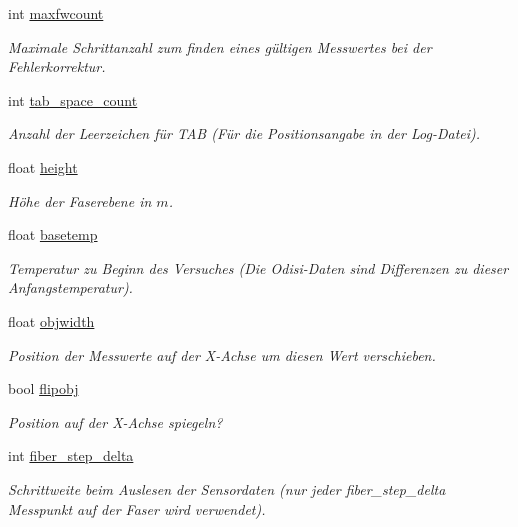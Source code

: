 \begin{DoxyCompactItemize}
int \hyperlink{structODiSIToSD_1_1Options_a03f0d8cd1ad0cbcaf9f3cee8ca6d536f}{maxfwcount}
\begin{DoxyCompactList}\small\item\em Maximale Schrittanzahl zum finden eines gültigen Messwertes bei der Fehlerkorrektur. \end{DoxyCompactList}\item 
int \hyperlink{structODiSIToSD_1_1Options_a6c1e796c1c96e350f7f01982ccc2b32f}{tab\-\_\-space\-\_\-count}
\begin{DoxyCompactList}\small\item\em Anzahl der Leerzeichen für T\-A\-B (Für die Positionsangabe in der Log-\/\-Datei). \end{DoxyCompactList}\item 
float \hyperlink{structODiSIToSD_1_1Options_af91210949f20d204dfea863766b53f9f}{height}
\begin{DoxyCompactList}\small\item\em Höhe der Faserebene in $m$. \end{DoxyCompactList}\item 
float \hyperlink{structODiSIToSD_1_1Options_a6fd0fff59f304ba9e8aee6a7c44a148a}{basetemp}
\begin{DoxyCompactList}\small\item\em Temperatur zu Beginn des Versuches (Die Odisi-\/\-Daten sind Differenzen zu dieser Anfangstemperatur). \end{DoxyCompactList}\item 
float \hyperlink{structODiSIToSD_1_1Options_a3819b09fef274e4cbc06b52f9d70e493}{objwidth}
\begin{DoxyCompactList}\small\item\em Position der Messwerte auf der X-\/\-Achse um diesen Wert verschieben. \end{DoxyCompactList}\item 
bool \hyperlink{structODiSIToSD_1_1Options_a014d92516c1c3abe5b482cdb648a1607}{flipobj}
\begin{DoxyCompactList}\small\item\em Position auf der X-\/\-Achse spiegeln? \end{DoxyCompactList}\item 
int \hyperlink{structODiSIToSD_1_1Options_a2759019ee4388dfaa5ec36f4530c7281}{fiber\-\_\-step\-\_\-delta}
\begin{DoxyCompactList}\small\item\em Schrittweite beim Auslesen der Sensordaten (nur jeder fiber\-\_\-step\-\_\-delta Messpunkt auf der Faser wird verwendet). \end{DoxyCompactList}\item 

\end{DoxyCompactItemize}
